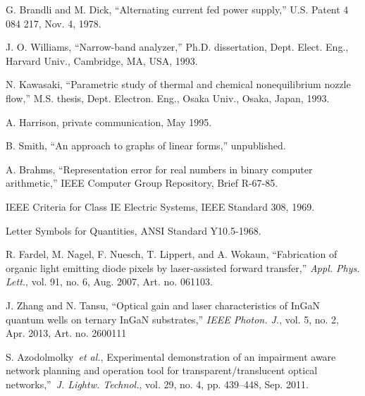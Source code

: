 \documentclass{IEEEtran}
\begin{document}
\begin{thebibliography}{00}
 G. Brandli and M. Dick, ``Alternating current fed power supply,'' U.S. Patent 4 084 217, Nov. 4, 1978.

 J. O. Williams, ``Narrow-band analyzer,'' Ph.D. dissertation, Dept. Elect. Eng., Harvard Univ., Cambridge, MA, USA, 1993.

 N. Kawasaki, ``Parametric study of thermal and chemical nonequilibrium nozzle flow,'' M.S. thesis, Dept. Electron. Eng., Osaka Univ., Osaka, Japan, 1993.

 A. Harrison, private communication, May 1995.

 B. Smith, ``An approach to graphs of linear forms,'' unpublished.

 A. Brahms, ``Representation error for real numbers in binary computer arithmetic,'' IEEE Computer Group Repository, Brief R-67-85.

 IEEE Criteria for Class IE Electric Systems, IEEE Standard 308, 1969.

 Letter Symbols for Quantities, ANSI Standard Y10.5-1968.

 R. Fardel, M. Nagel, F. Nuesch, T. Lippert, and A. Wokaun, ``Fabrication of organic light emitting diode pixels by laser-assisted forward transfer,'' \emph{Appl. Phys. Lett.}, vol. 91, no. 6, Aug. 2007, Art. no. 061103.~

 J. Zhang and N. Tansu, ``Optical gain and laser characteristics of InGaN quantum wells on ternary InGaN substrates,'' \emph{IEEE Photon. J.}, vol. 5, no. 2, Apr. 2013, Art. no. 2600111

 S. Azodolmolky~\emph{et al.}, Experimental demonstration of an impairment aware network planning and operation tool for transparent/translucent optical networks,''~\emph{J. Lightw. Technol.}, vol. 29, no. 4, pp. 439--448, Sep. 2011.

\end{thebibliography}
\end{document}

